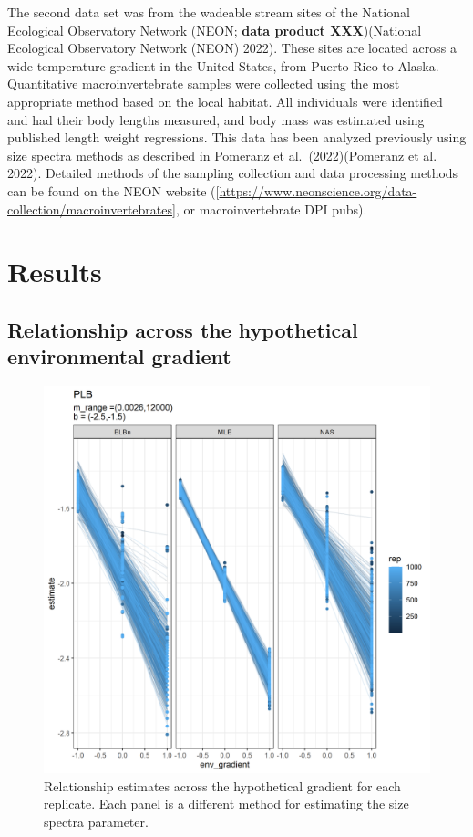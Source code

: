 \documentclass[
]{article}
\begin{document}
The second data set was from the wadeable stream sites of the National
Ecological Observatory Network (NEON; \textbf{data product
XXX})(National Ecological Observatory Network (NEON) 2022). These sites
are located across a wide temperature gradient in the United States,
from Puerto Rico to Alaska. Quantitative macroinvertebrate samples were
collected using the most appropriate method based on the local habitat.
All individuals were identified and had their body lengths measured, and
body mass was estimated using published length weight regressions. This
data has been analyzed previously using size spectra methods as
described in Pomeranz et al.~(2022)(Pomeranz et al. 2022). Detailed
methods of the sampling collection and data processing methods can be
found on the NEON website
({[}\url{https://www.neonscience.org/data-collection/macroinvertebrates}{]},
or macroinvertebrate DPI pubs).

\hypertarget{results}{%
\section{Results}\label{results}}

\hypertarget{relationship-across-the-hypothetical-environmental-gradient}{%
\subsection{Relationship across the hypothetical environmental
gradient}\label{relationship-across-the-hypothetical-environmental-gradient}}

\begin{figure}
\centering
\includegraphics{figures/PLB_sim_main.png}
\caption{Relationship estimates across the hypothetical gradient for
each replicate. Each panel is a different method for estimating the size
spectra parameter.}
\end{figure}
\end{document}
